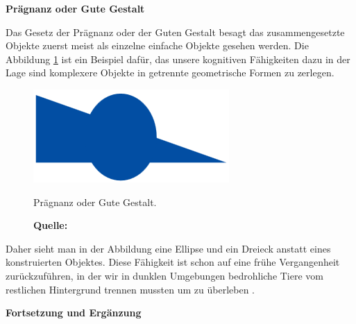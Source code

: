 \textbf{Prägnanz oder Gute Gestalt}

Das Gesetz der Prägnanz oder der Guten Gestalt besagt das zusammengesetzte Objekte zuerst meist als einzelne einfache Objekte gesehen werden. Die Abbildung \ref{fig:praegnanzOderGuteGestalt} ist ein Beispiel dafür, das unsere kognitiven Fähigkeiten dazu in der Lage sind komplexere Objekte in getrennte geometrische Formen zu zerlegen.
\begin{figure}[H]
  \centering
  \includegraphics[scale=1]{img/gesetz_der_Praegnanz_oder_der_Guten_Gestalt.PNG}
  \caption{Prägnanz oder Gute Gestalt.}
    \caption*{\textbf{Quelle:} \citep{Dahm2006}}
  \label{fig:praegnanzOderGuteGestalt}
\end{figure}
 Daher sieht man in der Abbildung eine Ellipse und ein Dreieck anstatt eines konstruierten Objektes. Diese Fähigkeit ist schon auf eine frühe Vergangenheit zurückzuführen, in der wir in dunklen Umgebungen bedrohliche Tiere vom restlichen Hintergrund trennen mussten um zu überleben \citep[vgl.][61]{Dahm2006}.

\textbf{Fortsetzung und Ergänzung}

